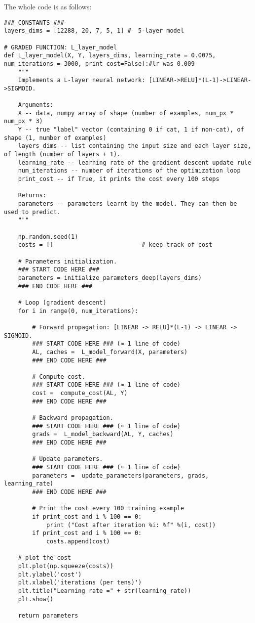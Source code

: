 The whole code is as follows:
\begin{verbatim}
### CONSTANTS ###
layers_dims = [12288, 20, 7, 5, 1] #  5-layer model

# GRADED FUNCTION: L_layer_model
def L_layer_model(X, Y, layers_dims, learning_rate = 0.0075, num_iterations = 3000, print_cost=False):#lr was 0.009
    """
    Implements a L-layer neural network: [LINEAR->RELU]*(L-1)->LINEAR->SIGMOID.
    
    Arguments:
    X -- data, numpy array of shape (number of examples, num_px * num_px * 3)
    Y -- true "label" vector (containing 0 if cat, 1 if non-cat), of shape (1, number of examples)
    layers_dims -- list containing the input size and each layer size, of length (number of layers + 1).
    learning_rate -- learning rate of the gradient descent update rule
    num_iterations -- number of iterations of the optimization loop
    print_cost -- if True, it prints the cost every 100 steps
    
    Returns:
    parameters -- parameters learnt by the model. They can then be used to predict.
    """

    np.random.seed(1)
    costs = []                         # keep track of cost
    
    # Parameters initialization.
    ### START CODE HERE ###
    parameters = initialize_parameters_deep(layers_dims)
    ### END CODE HERE ###
    
    # Loop (gradient descent)
    for i in range(0, num_iterations):

        # Forward propagation: [LINEAR -> RELU]*(L-1) -> LINEAR -> SIGMOID.
        ### START CODE HERE ### (≈ 1 line of code)
        AL, caches =  L_model_forward(X, parameters)
        ### END CODE HERE ###
        
        # Compute cost.
        ### START CODE HERE ### (≈ 1 line of code)
        cost =  compute_cost(AL, Y)
        ### END CODE HERE ###
    
        # Backward propagation.
        ### START CODE HERE ### (≈ 1 line of code)
        grads =  L_model_backward(AL, Y, caches)
        ### END CODE HERE ###
 
        # Update parameters.
        ### START CODE HERE ### (≈ 1 line of code)
        parameters =  update_parameters(parameters, grads, learning_rate)
        ### END CODE HERE ###
                
        # Print the cost every 100 training example
        if print_cost and i % 100 == 0:
            print ("Cost after iteration %i: %f" %(i, cost))
        if print_cost and i % 100 == 0:
            costs.append(cost)
            
    # plot the cost
    plt.plot(np.squeeze(costs))
    plt.ylabel('cost')
    plt.xlabel('iterations (per tens)')
    plt.title("Learning rate =" + str(learning_rate))
    plt.show()
    
    return parameters
\end{verbatim}


